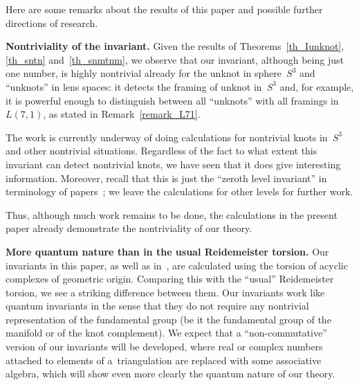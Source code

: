 \documentclass[pdftex]{sigma}
\begin{document}
Here are some remarks about the results of this paper and possible further directions of research.



{\bf Nontriviality of the invariant.} Given the results of Theorems~\ref{th_Iunknot}, \ref{th_sntn} and~\ref{th_snmtnm}, we
observe that our invariant, although being just one number, is highly nontrivial already for
the unknot in sphere~$S^3$ and ``unknots'' in lens spaces: it detects the framing of unknot
in~$S^3$ and, for example, it is powerful enough to distinguish between all ``unknots'' with
all framings in~$L(7,1)$, as stated in Remark~\ref{remark_L71}.

The work is currently underway of doing calculations for nontrivial knots in~$S^3$ and other
nontrivial situations. Regardless of the fact to what extent this invariant can detect
nontrivial knots, we have seen that it does give interesting information. Moreover, recall
that this is just the ``zeroth level invariant'' in terminology of
papers~\cite{korepanov-2009-1,korepanov-2009-2}; we leave the calculations for other levels
for further work.

Thus, although much work remains to be done, the calculations in the present paper already
demonstrate the nontriviality of our theory.



{\bf More quantum nature than in the usual Reidemeister torsion.} Our invariants in this paper, as well as in~\cite{korepanov-2009-1,korepanov-2009-2},
are calculated using the torsion of acyclic complexes of geometric origin. Comparing this
with the ``usual'' Reidemeister torsion, we see a striking dif\/ference between them. Our
invariants work like quantum invariants in the sense that they do not require any nontrivial
representation of the fundamental group (be it the fundamental group of the manifold or of
the knot complement). We expect that a ``non-commutative'' version of our invariants will be
developed, where real or complex numbers attached to elements of a~triangulation are
replaced with some associative algebra, which will show even more clearly the quantum nature
of our theory.
\end{document}
